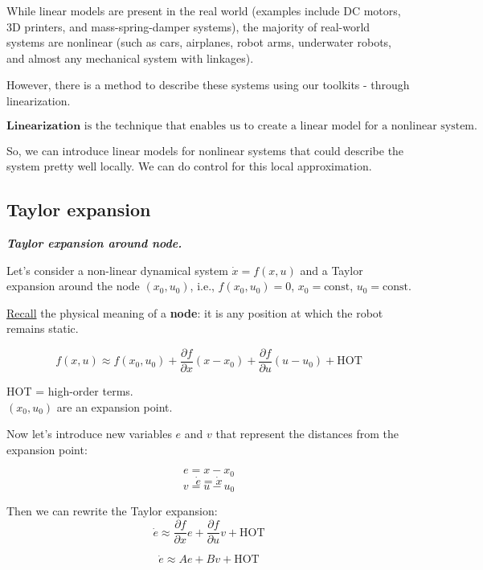 While linear models are present in the real world (examples include DC motors, 3D printers, and mass-spring-damper systems), the majority of real-world systems are nonlinear (such as cars, airplanes, robot arms, underwater robots, and almost any mechanical system with linkages).

However, there is a method to describe these systems using our toolkits - through linearization.

\begin{equation*}
    \boxed{\textbf{Linearization}} \text{ is the technique that enables us to create a linear model for a nonlinear system.}
\end{equation*}

So, we can introduce linear models for nonlinear systems that could describe the system pretty well locally. We can do control for this local approximation. 

\subsection{Taylor expansion}

\begin{center}
    \textit{\textbf{Taylor expansion around node.}}
\end{center}

Let's consider a non-linear dynamical system $\dot{x} = f(x, u)$ and a Taylor expansion around the node $(x_0, u_0)$, i.e., 
$f(x_0, u_0) = 0$, $x_0 = \text{const}$, $u_0 = \text{const}$. 

\underline{Recall} the physical meaning of a \textbf{node}: it is any position at which the robot remains static. 

\[
    f(x, u) \approx f(x_0, u_0) + \frac{\partial f}{\partial x} (x-x_0) + \frac{\partial f}{\partial u} (u-u_0) + \text{HOT}
\]

HOT = high-order terms. \\

$(x_0, u_0)$ are an expansion point.

Now let's introduce new variables $e$ and $v$ that represent the distances from the expansion point:

\[
e = x - x_0
\]
\[
\dot{e} = \dot{x}
\]
\[
v = u - u_0
\]

Then we can rewrite the Taylor expansion:
\[
    \dot e \approx \frac{\partial f}{\partial x} e + \frac{\partial f}{\partial u} v + \text{HOT}
\]

\[
    \dot e \approx A e + B v + \text{HOT}
\]


